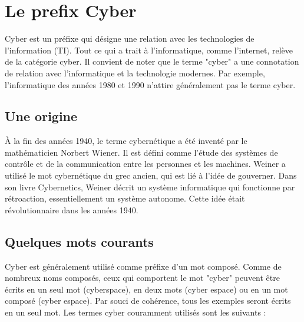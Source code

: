 %
%



\section{Le prefix Cyber}

Cyber est un préfixe qui désigne une relation avec les technologies de l'information (TI). Tout ce qui a trait à l'informatique, comme l'internet, relève de la catégorie cyber. Il convient de noter que le terme "cyber" a une connotation de relation avec l'informatique et la technologie modernes. Par exemple, l'informatique des années 1980 et 1990 n'attire généralement pas le terme cyber.

\subsection{Une origine}

À la fin des années 1940, le terme cybernétique a été inventé par le mathématicien Norbert Wiener. Il est défini comme l'étude des systèmes de contrôle et de la communication entre les personnes et les machines. Weiner a utilisé le mot cybernétique du grec ancien, qui est lié à l'idée de gouverner. Dans son livre Cybernetics, Weiner décrit un système informatique qui fonctionne par rétroaction, essentiellement un système autonome. Cette idée était révolutionnaire dans les années 1940.


\subsection{Quelques mots courants}

Cyber est généralement utilisé comme préfixe d'un mot composé. Comme de nombreux noms composés, ceux qui comportent le mot "cyber" peuvent être écrits en un seul mot (cyberspace), en deux mots (cyber espace) ou en un mot composé (cyber espace). Par souci de cohérence, tous les exemples seront écrits en un seul mot. Les termes cyber couramment utilisés sont les suivants :


